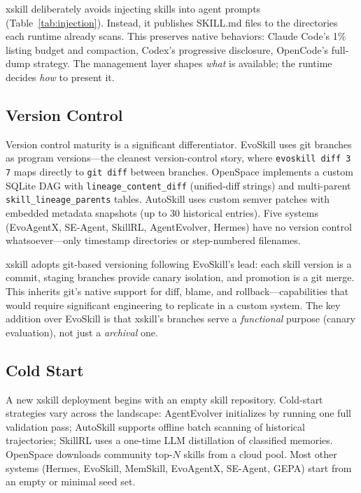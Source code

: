\documentclass[11pt]{article}
\begin{document}
xskill deliberately avoids injecting skills into agent prompts (Table~\ref{tab:injection}). Instead, it publishes SKILL.md files to the directories each runtime already scans. This preserves native behaviors: Claude Code's 1\% listing budget and compaction, Codex's progressive disclosure, OpenCode's full-dump strategy. The management layer shapes \emph{what} is available; the runtime decides \emph{how} to present it.

\subsection{Version Control}
\label{sec:versioncontrol}

Version control maturity is a significant differentiator. EvoSkill uses git branches as program versions---the cleanest version-control story, where \texttt{evoskill diff 3 7} maps directly to \texttt{git diff} between branches. OpenSpace implements a custom SQLite DAG with \texttt{lineage\_content\_diff} (unified-diff strings) and multi-parent \texttt{skill\_lineage\_parents} tables. AutoSkill uses custom semver patches with embedded metadata snapshots (up to 30 historical entries). Five systems (EvoAgentX, SE-Agent, SkillRL, AgentEvolver, Hermes) have no version control whatsoever---only timestamp directories or step-numbered filenames.

xskill adopts git-based versioning following EvoSkill's lead: each skill version is a commit, staging branches provide canary isolation, and promotion is a git merge. This inherits git's native support for diff, blame, and rollback---capabilities that would require significant engineering to replicate in a custom system. The key addition over EvoSkill is that xskill's branches serve a \emph{functional} purpose (canary evaluation), not just a \emph{archival} one.

\subsection{Cold Start}
\label{sec:coldstart}

A new xskill deployment begins with an empty skill repository. Cold-start strategies vary across the landscape: AgentEvolver initializes by running one full validation pass; AutoSkill supports offline batch scanning of historical trajectories; SkillRL uses a one-time LLM distillation of classified memories. OpenSpace downloads community top-$N$ skills from a cloud pool. Most other systems (Hermes, EvoSkill, MemSkill, EvoAgentX, SE-Agent, GEPA) start from an empty or minimal seed set.
\end{document}
